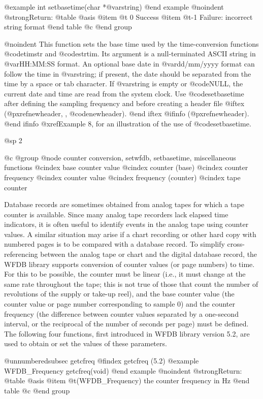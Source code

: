 {{{{{{{{{@example
int setbasetime(char *@var{string})
@end example
@noindent
@strong{Return:}
@table @asis
@item @t{ 0}
Success
@item @t{-1}
Failure: incorrect string format
@end table
@c @end group

@noindent
This function sets the base time used by the time-conversion functions
@code{timstr} and @code{strtim}.  Its argument is a null-terminated
ASCII string in @var{HH:MM:SS} format.  An optional base date in
@var{dd/mm/yyyy} format can follow the time in @var{string}; if present,
the date should be separated from the time by a space or tab character.  If
@var{string} is empty or @code{NULL}, the current date and time are read
from the system clock.  Use @code{setbasetime} after defining the sampling
frequency and before creating a header file
@iftex
(@pxref{newheader, , @code{newheader}}).
@end iftex
@ifinfo
(@pxref{newheader}).
@end ifinfo
@xref{Example 8}, for an illustration of the use of @code{setbasetime}.

@sp 2

@c @group
@node     counter conversion, setwfdb, setbasetime, miscellaneous functions
@cindex base counter value
@cindex counter (base)
@cindex counter frequency
@cindex counter value
@cindex frequency (counter)
@cindex tape counter

Database records are sometimes obtained from analog tapes for which a
tape counter is available.  Since many analog tape recorders lack
elapsed time indicators, it is often useful to identify events in the
analog tape using counter values.  A similar situation may arise if a
chart recording or other hard copy with numbered pages is to be compared
with a database record.  To simplify cross-referencing between the
analog tape or chart and the digital database record, the WFDB library
supports conversion of counter values (or page numbers) to time.  For this
to be possible, the counter must be linear (i.e., it must change at the
same rate throughout the tape; this is not true of those that count the
number of revolutions of the supply or take-up reel), and the base
counter value (the counter value or page number corresponding to sample
0) and the counter frequency (the difference between counter values
separated by a one-second interval, or the reciprocal of the number of
seconds per page) must be defined.  The following four functions,
first introduced in WFDB library version 5.2, are used to obtain or set
the values of these parameters.

@unnumberedsubsec getcfreq
@findex getcfreq (5.2)
@example
WFDB_Frequency getcfreq(void)
@end example
@noindent
@strong{Return:}
@table @asis
@item @t{(WFDB_Frequency)}
the counter frequency in Hz
@end table
@c @end group

}}}}}}}}}
